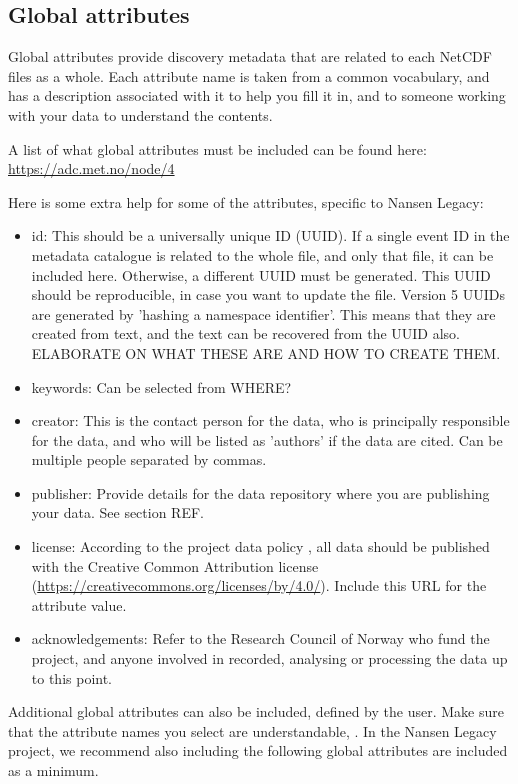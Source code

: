 \documentclass[a4paper,english, 11pt]{article}
\begin{document}
\subsection{Global attributes}
\label{ss:globalattributes}

Global attributes provide discovery metadata that are related to each NetCDF files as a whole. Each attribute name is taken from a common vocabulary, and has a description associated with it to help you fill it in, and to someone working with your data to understand the contents.

A list of what global attributes must be included can be found here:
\href{https://adc.met.no/node/4}{https://adc.met.no/node/4}

Here is some extra help for some of the attributes, specific to Nansen Legacy:
\begin{itemize}
\item id: This should be a universally unique ID (UUID). If a single event ID in the metadata catalogue is related to the whole file, and only that file, it can be included here. Otherwise, a different UUID must be generated. This UUID should be reproducible, in case you want to update the file. Version 5 UUIDs are generated by 'hashing a namespace identifier'. This means that they are created from text, and the text can be recovered from the UUID also. ELABORATE ON WHAT THESE ARE AND HOW TO CREATE THEM.
\item keywords: Can be selected from WHERE?
\item creator: This is the contact person for the data, who is principally responsible for the data, and who will be listed as 'authors' if the data are cited. Can be multiple people separated by commas.  
\item publisher: Provide details for the data repository where you are publishing your data. See section REF.
\item license: According to the project data policy \citep{aendatapolicy2021}, all data should be published with the Creative Common Attribution license (\href{https://creativecommons.org/licenses/by/4.0/}{https://creativecommons.org/licenses/by/4.0/}). Include this URL for the attribute value. 
\item acknowledgements: Refer to the Research Council of Norway who fund the project, and anyone involved in recorded, analysing or processing the data up to this point.
\end{itemize}

Additional global attributes can also be included, defined by the user. Make sure that the attribute names you select are understandable, . In the Nansen Legacy project, we recommend also including the following global attributes are included as a minimum. 
\end{document}
